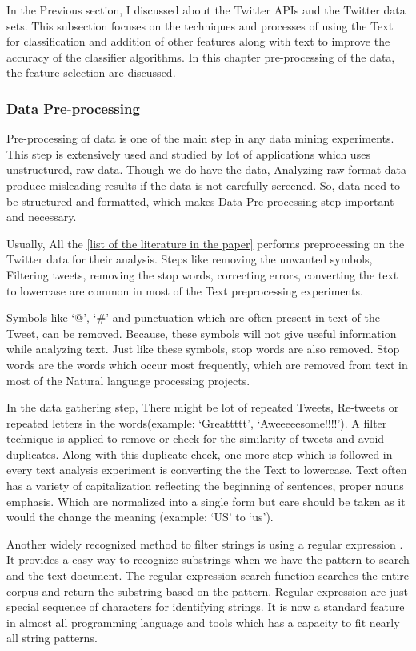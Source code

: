 In the Previous section, I discussed about the Twitter APIs and the Twitter data sets. This subsection focuses on the techniques and processes of using the Text for classification and addition of other features along with text to improve the accuracy of the classifier algorithms.  In this chapter pre-processing of the data, the feature selection are discussed.

\subsubsection{Data Pre-processing}

Pre-processing of data is one of the main step in any data mining experiments. This step is extensively used and studied by lot of applications which uses unstructured, raw data. Though we do have the data, Analyzing raw format data produce misleading results if the data is not carefully screened. So, data need to be structured and formatted, which makes Data Pre-processing step important and necessary.

Usually, All the \underline{[list of the literature in the paper]} performs preprocessing on the Twitter data for their analysis. Steps like removing the unwanted symbols, Filtering tweets, removing the stop words,  correcting errors, converting the text to lowercase are common in most of the Text preprocessing experiments.

Symbols like `@', `\#' and punctuation which are often present in text of the Tweet, can be removed. Because, these symbols will not give useful information while analyzing text. Just like these symbols, stop words are also removed. Stop words are the words which occur most frequently, which are removed from text in most of the Natural language processing projects. 

In the data gathering step, There might be lot of repeated Tweets, Re-tweets or repeated letters in the words(example: `Greattttt', `Aweeeeesome!!!!'). A filter technique is applied to remove or check for the similarity of tweets and avoid duplicates. Along with this duplicate check, one more step which is followed in every text analysis experiment is converting the the Text to lowercase. Text often has a variety of capitalization reflecting the beginning of sentences, proper nouns emphasis. Which are normalized into a single form but care should be taken as it would the change the meaning (example: `US' to `us').

Another widely recognized method to filter strings is using a regular expression \cite{Thompson}. It provides a easy way to recognize substrings when we have the pattern to search and the text document. The regular expression search function searches the entire corpus and return the substring based on the pattern. Regular expression are just special sequence of characters for identifying strings. It is now a standard feature in almost all programming language and tools which has a capacity to fit nearly all string patterns.   

